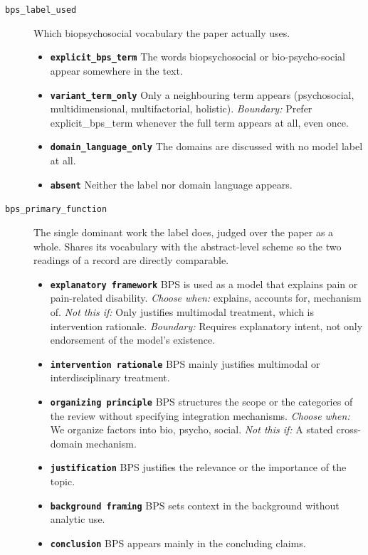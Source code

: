 \documentclass[11pt]{article}
\begin{document}
\begin{description}
\item[\texttt{bps\_label\_used}] Which biopsychosocial vocabulary the paper actually uses.
  \begin{itemize}[leftmargin=1.3em,itemsep=2pt,topsep=2pt]
  \item \textbf{\texttt{explicit\_bps\_term}} The words biopsychosocial or bio-psycho-social appear somewhere in the text.
  \item \textbf{\texttt{variant\_term\_only}} Only a neighbouring term appears (psychosocial, multidimensional, multifactorial, holistic). {\small \textit{Boundary:} Prefer explicit\_bps\_term whenever the full term appears at all, even once.}
  \item \textbf{\texttt{domain\_language\_only}} The domains are discussed with no model label at all.
  \item \textbf{\texttt{absent}} Neither the label nor domain language appears.
  \end{itemize}
\item[\texttt{bps\_primary\_function}] The single dominant work the label does, judged over the paper as a whole. Shares its vocabulary with the abstract-level scheme so the two readings of a record are directly comparable.
  \begin{itemize}[leftmargin=1.3em,itemsep=2pt,topsep=2pt]
  \item \textbf{\texttt{explanatory framework}} BPS is used as a model that explains pain or pain-related disability. {\small \textit{Choose when:} explains, accounts for, mechanism of. \textit{Not this if:} Only justifies multimodal treatment, which is intervention rationale. \textit{Boundary:} Requires explanatory intent, not only endorsement of the model's existence.}
  \item \textbf{\texttt{intervention rationale}} BPS mainly justifies multimodal or interdisciplinary treatment.
  \item \textbf{\texttt{organizing principle}} BPS structures the scope or the categories of the review without specifying integration mechanisms. {\small \textit{Choose when:} We organize factors into bio, psycho, social. \textit{Not this if:} A stated cross-domain mechanism.}
  \item \textbf{\texttt{justification}} BPS justifies the relevance or the importance of the topic.
  \item \textbf{\texttt{background framing}} BPS sets context in the background without analytic use.
  \item \textbf{\texttt{conclusion}} BPS appears mainly in the concluding claims.

\end{itemize}
\end{description}
\end{document}
